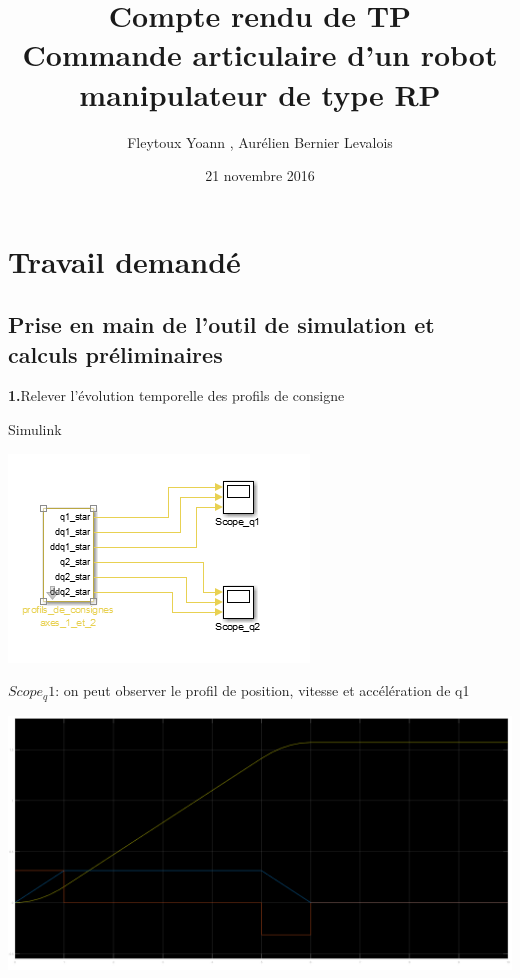 \documentclass[12pt]{article}
\title{Compte rendu de TP\\ \textbf{Commande articulaire d'un robot manipulateur de type RP}}
\author{Fleytoux Yoann , Aurélien Bernier Levalois}
\date{21 novembre 2016}
\begin{document}
\maketitle


\tableofcontents
\vspace{0.6cm}


\section{Travail demandé}
 
\subsection{Prise en main de l'outil de simulation et calculs préliminaires}
\smallbreak
\medbreak
\textbf{1.}Relever l'évolution temporelle des profils de consigne

\smallbreak
Simulink
\begin{flushleft}
\includegraphics[width=\textwidth,height=\textheight,keepaspectratio]{1_1.PNG}
\end{flushleft}

$Scope_q1$: on peut observer le profil de position, vitesse et accélération de q1
\begin{flushleft}
\includegraphics[width=\textwidth,height=\textheight,keepaspectratio]{1_1_q1.PNG}
\end{flushleft}
\end{document}
